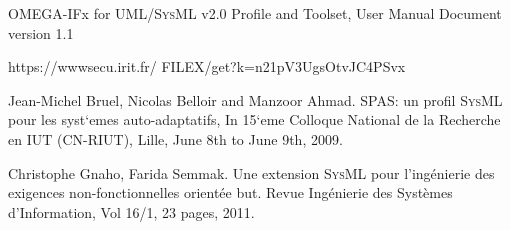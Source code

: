 \documentclass[a4paper,twoside]{article}
\def\sysml{\textsc{SysML}}
\def\uml{\textsc{UML}}
\begin{document}
\begin{thebibliography}{1}
 OMEGA-IFx for \uml{}/\sysml{} v2.0 Profile and Toolset, User Manual Document version 1.1

 https://wwwsecu.irit.fr/
FILEX/get?k=n21pV3UgsOtvJC4PSvx

 Jean-Michel Bruel, Nicolas Belloir and Manzoor Ahmad. SPAS: un proﬁl \sysml{} pour les syst`emes auto-adaptatifs, In 15`eme Colloque National de la Recherche en IUT (CN-RIUT), Lille, June 8th to June 9th, 2009.

 Christophe Gnaho, Farida Semmak. Une extension \sysml{} pour l'ing\'enierie des exigences non-fonctionnelles orient\'ee but. Revue Ing\'enierie des Syst\`emes d'Information, Vol 16/1, 23 pages, 2011.




\end{thebibliography}

%
\vfill
\end{document}
